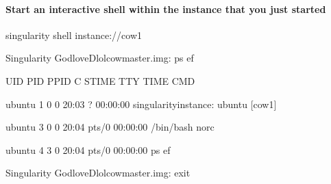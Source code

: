 \documentclass[letterpaper,10pt,english]{sphinxmanual}
\begin{document}
\paragraph{Start an interactive shell within the instance that you just started}
\label{\detokenize{appendix:start-an-interactive-shell-within-the-instance-that-you-just-started}}
%
\begin{sphinxVerbatim}[commandchars=\\\{\}]
\PYGZdl{} singularity shell instance://cow1

Singularity GodloveD\PYGZhy{}lolcow\PYGZhy{}master.img:\PYGZti{}\PYGZgt{} ps \PYGZhy{}ef

UID        PID  PPID  C STIME TTY          TIME CMD

ubuntu       1     0  0 20:03 ?        00:00:00 singularity\PYGZhy{}instance: ubuntu [cow1]

ubuntu       3     0  0 20:04 pts/0    00:00:00 /bin/bash \PYGZhy{}\PYGZhy{}norc

ubuntu       4     3  0 20:04 pts/0    00:00:00 ps \PYGZhy{}ef

Singularity GodloveD\PYGZhy{}lolcow\PYGZhy{}master.img:\PYGZti{}\PYGZgt{} exit
\end{sphinxVerbatim}
\end{document}
